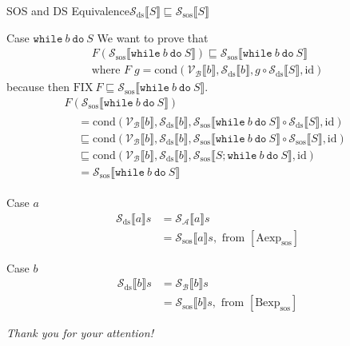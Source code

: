 \documentclass{beamer}
\newcommand{\while}[2]{\mathtt{while}\ #1\ \mathtt{do}\ #2}
\newcommand{\sem}[2]{\mathcal{#1} \llbracket #2 \rrbracket}
\begin{document}
\begin{frame}{SOS and DS Equivalence}{$\sem{S_\mathrm{ds}}{S} \sqsubseteq \sem{S_\mathrm{sos}}{S}$}
\begin{overprint}
        \begin{block}{Case $\while{b}{S}$}
            We want to prove that
            \begin{gather*}
                F(\sem{S_\mathrm{sos}}{\while{b}{S}}) \sqsubseteq \sem{S_\mathrm{sos}}{\while{b}{S}} \\
                \mbox{where } F\;g = \mathrm{cond}(\sem{V_B}{b}, \sem{S_\mathrm{ds}}{b}, g \circ \sem{S_{\mathrm{ds}}}{S},\mathrm{id})
            \end{gather*}
            because then $\mathrm{FIX}\ F \sqsubseteq \sem{S_\mathrm{sos}}{\while{b}{S}}$.
            \begin{multline*}
                F(\sem{S_\mathrm{sos}}{\while{b}{S}}) \\
                \begin{aligned}
                     & = \mathrm{cond}(\sem{V_B}{b}, \sem{S_\mathrm{ds}}{b}, \sem{S_\mathrm{sos}}{\while{b}{S}} \circ \sem{S_{\mathrm{ds}}}{S},\mathrm{id})            \\
                     & \sqsubseteq \mathrm{cond}(\sem{V_B}{b}, \sem{S_\mathrm{ds}}{b}, \sem{S_\mathrm{sos}}{\while{b}{S}} \circ \sem{S_{\mathrm{sos}}}{S},\mathrm{id}) \\
                     & \sqsubseteq \mathrm{cond}(\sem{V_B}{b}, \sem{S_\mathrm{ds}}{b}, \sem{S_\mathrm{sos}}{S; \while{b}{S}},\mathrm{id})                              \\
                     & = \sem{S_\mathrm{sos}}{\while{b}{S}}
                \end{aligned}
            \end{multline*}
        \end{block}


        \begin{block}{Case $a$}
            \begin{align*}
                \sem{S_{\mathrm{ds}}}{a}s
                 & = \sem{S_A}{a}s                                                          \\
                 & = \sem{S_{\mathrm{sos}}}{a}s, \mbox{ from } [\mbox{Aexp}_{\mathrm{sos}}]
            \end{align*}
        \end{block}
        \begin{block}{Case $b$}
            \begin{align*}
                \sem{S_{\mathrm{ds}}}{b}s
                 & = \sem{S_B}{b}s                                                          \\
                 & = \sem{S_{\mathrm{sos}}}{b}s, \mbox{ from } [\mbox{Bexp}_{\mathrm{sos}}]
            \end{align*}
        \end{block}
    \end{overprint}

\end{frame}

\begin{frame}
    \centering \huge
    \emph{Thank you for your attention!}
\end{frame}
\end{document}
